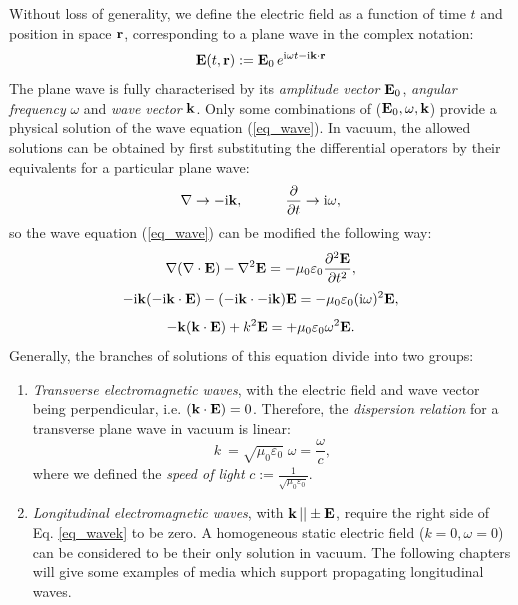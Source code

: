 Without loss of generality, we define the electric field as a function of time $t$ and position in space ${\mathbf{r}}$, corresponding to a plane wave in the complex notation:
\begin{equation} \mathbf{E}(t, {\mathbf{r}}) := \mathbf{E}_0\, e^{{\mathrm i}\omega t - {\mathrm i}{\mathbf{k}}\cdot{\mathbf{r}}} \label{eq_pw}\end{equation}
The plane wave is fully characterised by its \textit{amplitude vector} $\mathbf{E}_0$, \textit{angular frequency} $\omega$ and \textit{wave vector} ${\mathbf{k}}$. 
Only some combinations of ($\mathbf{E}_0, \omega, {\mathbf{k}}$) provide a physical solution of the wave equation (\ref{eq_wave}). In vacuum, the allowed solutions can be obtained by first substituting the differential operators by their equivalents for a particular plane wave: %
\begin{equation} \nabla \rightarrow -{\mathrm i}{\mathbf{k}}, \quad\quad\quad 
\frac{\partial} {\partial t} \rightarrow {\mathrm i}\omega, \label{eq_difftok}\end{equation}
so the wave equation (\ref{eq_wave}) can be modified the following way:
$$					\nabla (\nabla \cdot \mathbf{E}) - \nabla^2 \mathbf{E}				  =	-\mu_0 \varepsilon_0 \frac{\partial^{2} \mathbf{E}}{\partial t^{2}},  $$
$$				 -{\mathrm i}{\mathbf{k}} (-{\mathrm i}{\mathbf{k}} \cdot \mathbf{E})  - (-{\mathrm i}{\mathbf{k}} \cdot -{\mathrm i}{\mathbf{k}}) \mathbf{E} = -\mu_0 \varepsilon_0 ({\mathrm i}\omega)^2 \mathbf{E}, $$
\begin{equation}   - {\mathbf{k}} ({\mathbf{k}} \cdot \mathbf{E})      +          k^2 \mathbf{E}            = +\mu_0 \varepsilon_0 \omega^{2} \mathbf{E}.  \label{eq_wavek}\end{equation}
Generally, the branches  of solutions of this equation divide into two groups: %
\begin{enumerate}
 \item{\textit{Transverse electromagnetic waves}, with the electric field and wave vector being perpendicular, i.e. $({\mathbf{k}} \cdot \mathbf{E}) = 0$. Therefore, the \textit{dispersion relation} for a transverse plane wave in vacuum is linear:
\begin{equation} k~= \sqrt{\mu_0 \varepsilon_0}\; \omega = \frac{\omega}{c}, \label{eq_dispeq_vac}\end{equation}
where we defined the \textit{speed of light} $c := \frac{1}{\sqrt{\mu_0 \varepsilon_0}}$.
} 
 \item{\textit{Longitudinal electromagnetic waves}, with ${\mathbf{k}}\,|| \pm \mathbf{E}$, require the right side of Eq. \ref{eq_wavek} to be zero. A homogeneous static electric field ($k = 0, \omega = 0$) can be considered to be their only solution in vacuum. The following chapters will give some examples of media which support propagating longitudinal waves.} 
 \end{enumerate}

